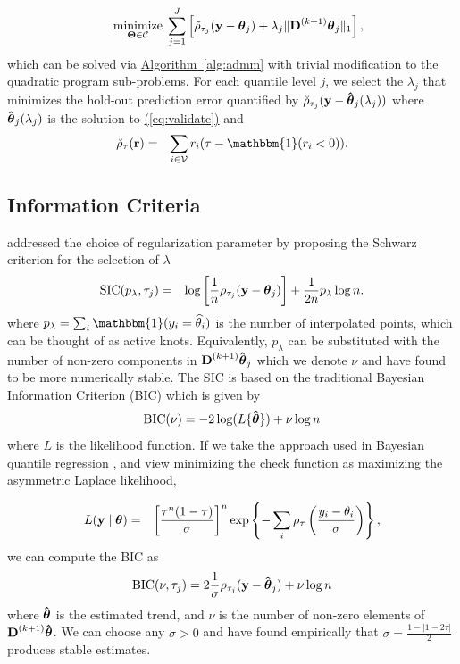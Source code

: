\documentclass[aoas]{imsart}
\newcommand{\Eqn}[1]{\hyperref[eq:#1]{{\rm (\ref*{eq:#1})}}} %
\newcommand{\Alg}[1]{\hyperref[alg:#1]{Algorithm~\ref*{alg:#1}}} %
\newcommand{\Eqn}[1]{{(\ref{eq:#1})}} %
\newcommand{\Alg}[1]{{Algorithm~\ref{alg:#1}}} %
\newcommand{\One}{\mathbbm{1}}
\newcommand{\V}[1]{{\bm{\mathbf{\MakeLowercase{#1}}}}} %
\newcommand{\VE}[2]{\MakeLowercase{#1}_{#2}} %
\newcommand{\Vhat}[1]{{\bm{\hat \mathbf{\MakeLowercase{#1}}}}} %
\newcommand{\M}[1]{{\bm{\mathbf{\MakeUppercase{#1}}}}} %
\newcommand{\Mn}[2]{\M{#1}^{(#2)}} %
\begin{document}
\begin{eqnarray}
\label{eq:validate}
&&\underset{\M{\Theta} \in \mathcal{C}}{\text{minimize}}\; \sum_{j=1}^J \left [\tilde{\rho}_{\tau_j}(\V{y} - \V{\theta}_{j}) +
\lambda_j \lVert \Mn{D}{k+1} \V{\theta}_j \rVert_1 \right ],
\end{eqnarray}
which can be solved via \Alg{admm} with trivial modification to the quadratic program sub-problems. For each quantile level $j$, we select the $\lambda_j$ that minimizes the hold-out prediction error quantified by $\breve{\rho}_{\tau_j}(\V{y} - \Vhat{\theta}_j(\lambda_j))$ where $\Vhat{\theta}_j(\lambda_j)$ is the solution to \Eqn{validate} and
\begin{eqnarray*}
	\breve{\rho}_{\tau}(\V{r}) & = & \sum_{i \in \mathcal{V}} \VE{r}{i}(\tau-\One(\VE{r}{i}<0)).
\end{eqnarray*}

\subsection{Information Criteria}
\cite{KoenkerNgPortnoy1994} addressed the choice of regularization parameter by proposing the Schwarz criterion for the selection of $\lambda$
\begin{eqnarray*}
	\label{eq:SIC}
	\mbox{SIC}(p_{\lambda}, \tau_j) & = & \log\left[\frac{1}{n}\rho_{\tau_j}(\V{y} - \V{\theta}_j)\right] + \frac{1}{2n}p_{\lambda}\log n.
\end{eqnarray*}
where $p_{\lambda} = \sum_i \One(\VE{y}{i} = \widehat{\theta}_i)$ is the number of interpolated points, which can be thought of as active knots. Equivalently, $p_{\lambda}$ can be substituted with the number of non-zero components in $\M{D}^{(k+1)}\Vhat{\theta}_j$ which we denote $\nu$ and have found to be more numerically stable.  The SIC is based on the traditional Bayesian Information Criterion (BIC) which is given by
\begin{equation}
\mbox{BIC}(\nu) = -2\log(L\{\Vhat{\theta}\}) + \nu\log n
\end{equation}
where $L$ is the likelihood function. If we take the approach used in Bayesian quantile regression \citep{yu2001bayesian}, and view minimizing the check function as maximizing the asymmetric Laplace likelihood,

\begin{eqnarray*}
	L(\V{y} \mid \V{\theta}) & = & \left[\frac{\tau^n(1-\tau)}{\sigma}\right]^n\exp\left\{-\sum_i\rho_\tau\left(\frac{\VE{y}{i} - \VE{\theta}{i}}{\sigma}\right)\right\},
\end{eqnarray*}
we can compute the BIC as
\begin{eqnarray*}
	\mbox{BIC}(\nu, \tau_j) = 2\frac{1}{\sigma}\rho_{\tau_j}(\V{y}-\Vhat{\theta}_j) + \nu\log n
\end{eqnarray*}
where $\Vhat{\theta}$ is the estimated trend, and $\nu$ is the number of non-zero elements of $\Mn{D}{k+1}\Vhat{\theta}$. We can choose any $\sigma>0$ and have found empirically that $\sigma =  \frac{1-|1-2\tau|}{2}$ produces stable estimates.
\end{document}
